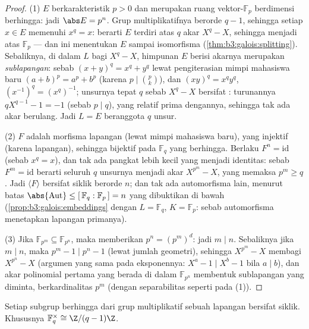 \begin{proof}
(1)  $E$ berkarakteristik $p > 0$ dan merupakan
ruang vektor-$\mathbb F_p$ berdimensi berhingga: jadi $\abs E = p^n$.
Grup multiplikatifnya berorde $q - 1$, sehingga setiap $x \in E$
memenuhi $x^q = x$: berarti $E$ terdiri atas $q$ akar $X^q - X$,
sehingga menjadi  atas $\mathbb F_p$ ---
dan ini menentukan $E$ sampai isomorfisma
(\cref{thm:b3:galois:splitting}). Sebaliknya, di dalam  $L$ bagi $X^q - X$, himpunan $E$ berisi akarnya merupakan
\emph{sublapangan}: sebab $(x + y)^q = x^q + y^q$ lewat pengiterasian
mimpi mahasiswa baru $(a+b)^p = a^p + b^p$ (karena $p \mid \binom pk$), dan
$(xy)^q = x^qy^q$, $(x^{-1})^q = (x^q)^{-1}$; unsurnya tepat $q$
sebab $X^q - X$ bersifat : turunannya
$qX^{q-1} - 1 = -1$ (sebab $p \mid q$), yang relatif prima dengannya, sehingga tak ada
akar berulang. Jadi $L = E$ beranggota $q$ unsur.

(2) $F$ adalah morfisma lapangan (lewat mimpi mahasiswa baru), yang injektif
(karena lapangan), sehingga bijektif pada $\mathbb F_q$ yang berhingga. Berlaku $F^n =
\mathrm{id}$ (sebab $x^q = x$), dan tak ada pangkat lebih kecil yang menjadi identitas:
sebab $F^m = \mathrm{id}$ berarti seluruh $q$ unsurnya menjadi akar
$X^{p^m} - X$, yang memaksa $p^m \geq q$. Jadi $\langle F\rangle$ bersifat
siklik berorde $n$; dan tak ada automorfisma lain, menurut
batas $\abs{\operatorname{Aut}} \leq [\,\mathbb F_q :
\mathbb F_p\,] = n$ yang dibuktikan di bawah
(\cref{prop:b3:galois:embeddings} dengan $L = \mathbb F_q$, $K =
\mathbb F_p$: sebab automorfisma menetapkan lapangan primanya).

(3) Jika $\mathbb F_{p^m} \subseteq \mathbb F_{p^n}$, maka 
memberikan $p^n = (p^m)^d$: jadi $m \mid n$. Sebaliknya jika $m \mid n$, maka
$p^m - 1 \mid p^n - 1$ (lewat jumlah geometri), sehingga $X^{p^m} - X$ membagi
$X^{p^n} - X$ (argumen yang sama pada eksponennya: $X^{a} - 1 \mid X^{b}
- 1$ bila $a \mid b$), dan akar polinomial pertama yang berada di dalam
$\mathbb F_{p^n}$ membentuk sublapangan yang diminta, berkardinalitas
$p^m$ (dengan separabilitas seperti pada (1)).
\end{proof}

\begin{theorem}[Kesiklikan]\label{thm:b3:galois:cyclic}
Setiap subgrup berhingga dari grup multiplikatif sebuah lapangan bersifat
siklik. Khususnya $\mathbb F_q^\times \cong
\Z/(q-1)\Z$.
\end{theorem}

